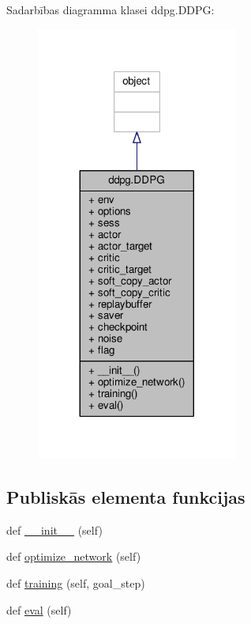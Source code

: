 Sadarbības diagramma klasei ddpg.\+D\+D\+PG\+:
\nopagebreak
\begin{figure}[H]
\begin{center}
\leavevmode
\includegraphics[width=188pt]{classddpg_1_1_d_d_p_g__coll__graph}
\end{center}
\end{figure}
\subsection*{Publiskās elementa funkcijas}
\begin{DoxyCompactItemize}
\item 
def \hyperlink{classddpg_1_1_d_d_p_g_ae5e2615ed363feea9c437913b1cfc71f}{\+\_\+\+\_\+init\+\_\+\+\_\+} (self)
\item 
def \hyperlink{classddpg_1_1_d_d_p_g_a06c8a226bfc7c56f33a74da00ed8bcec}{optimize\+\_\+network} (self)
\item 
def \hyperlink{classddpg_1_1_d_d_p_g_a5237a908e38e5ac76c6b733fc61aeb3d}{training} (self, goal\+\_\+step)
\item 
def \hyperlink{classddpg_1_1_d_d_p_g_a2784ad40da92d5131c80f25736b0413b}{eval} (self)
\end{DoxyCompactItemize}
